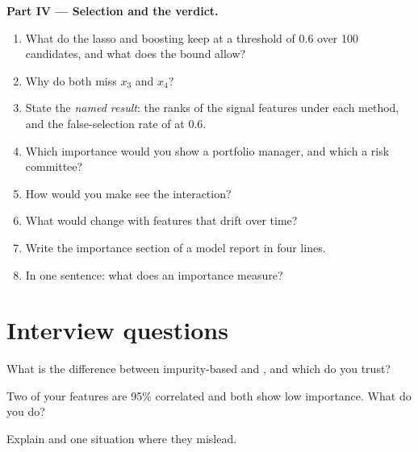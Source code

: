 \begin{problem}
\medskip\noindent\textbf{Part IV --- Selection and the verdict.}
\begin{enumerate}[resume]
\item What do the lasso and boosting keep at a threshold of 0.6 over 100 candidates, and what does the bound allow?
\item Why do both miss $x_3$ and $x_4$?
\item State the \emph{named result}: the ranks of the signal features under each method, and the false-selection rate of
 at 0.6.
\item Which importance would you show a portfolio manager, and which a risk committee?
\item How would you make  see the interaction?
\item What would change with features that drift over time?
\item Write the importance section of a model report in four lines.
\item In one sentence: what does an importance measure?
\end{enumerate}
\end{problem}

\section{Interview questions}

\begin{interviewq}\label{iq:ml:feature-engineering-selection-and-importance:1}
What is the difference between impurity-based and , and which do you trust?
\end{interviewq}

\begin{interviewq}\label{iq:ml:feature-engineering-selection-and-importance:2}
Two of your features are 95\% correlated and both show low importance. What do you do?
\end{interviewq}

\begin{interviewq}\label{iq:ml:feature-engineering-selection-and-importance:3}
Explain  and one situation where they mislead.
\end{interviewq}

